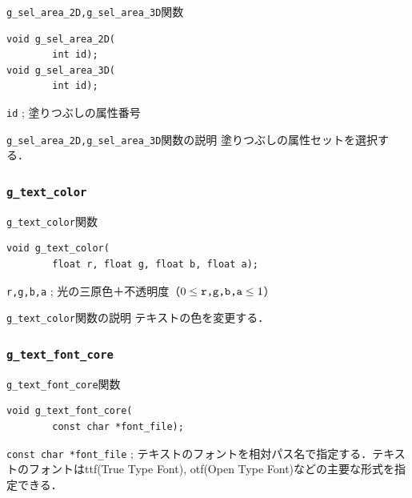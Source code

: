 \documentclass[platex,a4paper,12pt]{jsarticle}%
\begin{document}
\begin{itembox}[l]{\texttt{g\_sel\_area\_2D,g\_sel\_area\_3D}関数}
\begin{verbatim}
void g_sel_area_2D(
        int id);
void g_sel_area_3D(
        int id);
\end{verbatim}
\verb|id| ; 塗りつぶしの属性番号\\
\end{itembox}

\begin{itembox}[l]{\texttt{g\_sel\_area\_2D,g\_sel\_area\_3D}関数の説明}
塗りつぶしの属性セットを選択する．
\end{itembox}


\clearpage
\subsubsection{\texttt{g\_text\_color}}

\begin{itembox}[l]{\texttt{g\_text\_color}関数}
\begin{verbatim}
void g_text_color(
        float r, float g, float b, float a);
\end{verbatim}
\verb|r,g,b,a| ; 光の三原色＋不透明度（$0\leq \verb|r,g,b,a| \leq 1$）\\
\end{itembox}

\begin{itembox}[l]{\texttt{g\_text\_color}関数の説明}
テキストの色を変更する．
\end{itembox}

\subsubsection{\texttt{g\_text\_font\_core}}

\begin{itembox}[l]{\texttt{g\_text\_font\_core}関数}
\begin{verbatim}
void g_text_font_core(
        const char *font_file);
\end{verbatim}
\verb|const char *font_file| ; テキストのフォントを相対パス名で指定する．テキストのフォントはttf(True Type Font), otf(Open Type Font)などの主要な形式を指定できる．\\
\end{itembox}
\end{document}
